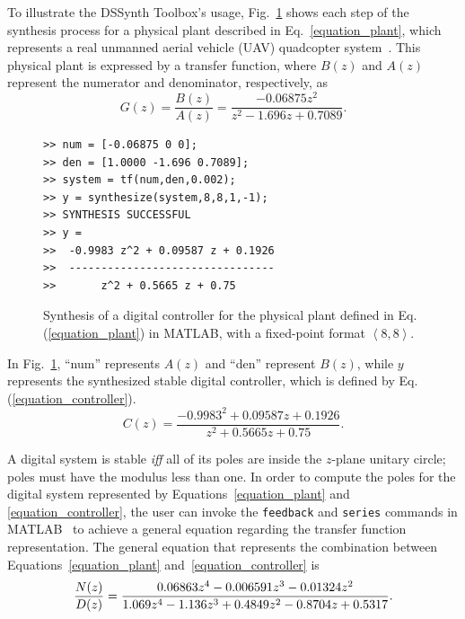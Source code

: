 \documentclass[10pt,conference]{IEEEtran}
\newcommand\tool{{DSSynth Toolbox}\xspace}
\begin{document}
To illustrate the \tool's usage, Fig.~\ref{toolbox-usage} shows each step of the 
synthesis process for a physical plant described in Eq.~\eqref{equation_plant},
which represents a real unmanned aerial vehicle (UAV) quadcopter system~\cite{bouabdallah}. 
This physical plant is expressed by a transfer function, where 
$B(z)$ and $A(z)$ represent the numerator and denominator, respectively, as
%
\begin{equation}
\label{equation_plant}
G(z)=\frac{B(z)}{A(z)}=\frac{-0.06875z^{2}}{z^2-1.696z+0.7089}.
\end{equation}

\begin{figure}[ht]
\scriptsize
\begin{lstlisting}[xleftmargin=.025\textwidth,xrightmargin=.025\textwidth, frame=single,]
>> num = [-0.06875 0 0];
>> den = [1.0000 -1.696 0.7089];
>> system = tf(num,den,0.002);
>> y = synthesize(system,8,8,1,-1);
>> SYNTHESIS SUCCESSFUL
>> y = 
>>  -0.9983 z^2 + 0.09587 z + 0.1926
>>  --------------------------------
>>       z^2 + 0.5665 z + 0.75
\end{lstlisting}
\vspace{-0.2cm}
\caption{Synthesis of a digital controller for the physical plant defined in Eq.(\ref{equation_plant}) in MATLAB, with a fixed-point format  $\left\langle 8,8\right\rangle$.}
\label{toolbox-usage}
\end{figure}

In Fig.~\ref{toolbox-usage}, ``num'' represents $A(z)$ and ``den'' represent $B(z)$, while 
$y$ represents the synthesized stable digital controller, which is defined by Eq.(\ref{equation_controller}).
%
\begin{equation}
\label{equation_controller}
C(z)=\frac{-0.9983^{2}+0.09587z+0.1926}{z^2+0.5665z+0.75}.
\end{equation}

A digital system is stable \textit{iff} all of its poles are inside the $z$-plane unitary circle; 
poles must have the modulus less than one. In order to compute the poles for the digital 
system represented by Equations~\eqref{equation_plant} and \eqref{equation_controller}, 
the user can invoke the \texttt{feedback} and \texttt{series} commands in MATLAB~\cite{matlab-toolbox} 
to achieve a general equation regarding the transfer function representation. 
The general equation that represents the combination between Equations~\eqref{equation_plant}
and~\eqref{equation_controller} is
%
\begin{equation}
\small
\label{equation_general}
\frac{N(z)}{D(z)}=\frac{0.06863z^{4} - 0.006591z^{3} - 0.01324z^{2}}{1.069z^{4} - 1.136z^{3} + 0.4849z^{2} -0.8704z + 0.5317}.
\end{equation}
 
\end{document}
